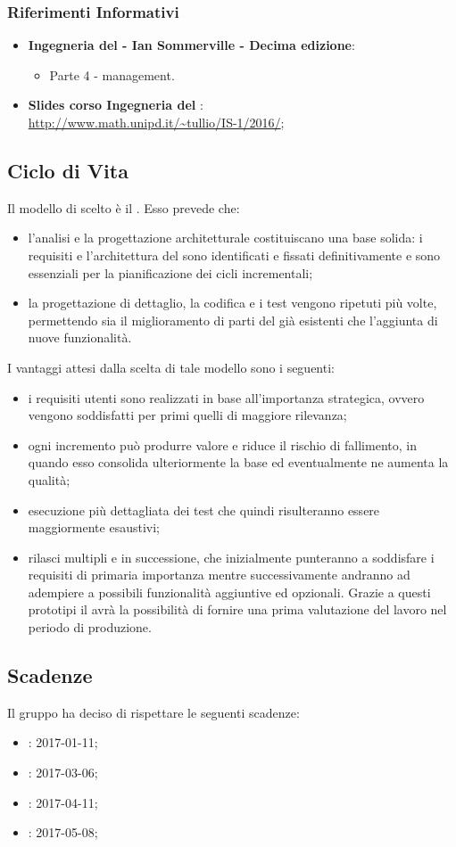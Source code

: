 	    \subsubsection{Riferimenti Informativi}
	    	\begin{itemize}
	    		\item \textbf{Ingegneria del  - Ian Sommerville - Decima edizione}:
	    		\begin{itemize}
	    			\item Parte 4 -  management.
	    		\end{itemize}
	    		\item \textbf{Slides corso Ingegneria del }: \\ \url{http://www.math.unipd.it/~tullio/IS-1/2016/};
	    	\end{itemize}
	    
	    \subsection{Ciclo di Vita}
	    Il modello di  scelto è il . Esso prevede che:
	    \begin{itemize}
	    	\item l'analisi e la progettazione architetturale costituiscano una base solida: i requisiti e l'architettura del  sono identificati e fissati definitivamente e sono essenziali per la pianificazione dei cicli incrementali;
	    	\item la progettazione di dettaglio, la codifica e i test vengono ripetuti più volte, permettendo sia il miglioramento di parti del  già esistenti che l'aggiunta di nuove funzionalità.
	    \end{itemize}
	    I vantaggi attesi dalla scelta di tale modello sono i seguenti:
	    \begin{itemize}
	    	\item i requisiti utenti sono realizzati in base all'importanza strategica, ovvero vengono soddisfatti per primi quelli di maggiore rilevanza;
	    	\item ogni incremento può produrre valore e riduce il rischio di fallimento, in quando esso consolida ulteriormente la base ed eventualmente ne aumenta la qualità;
	    	\item esecuzione più dettagliata dei test che quindi risulteranno essere maggiormente esaustivi;
	    	\item rilasci multipli e in successione, che inizialmente punteranno a soddisfare i requisiti di primaria importanza mentre successivamente andranno ad adempiere a possibili funzionalità aggiuntive ed opzionali. Grazie a questi prototipi il  avrà la possibilità di fornire una prima valutazione del lavoro nel periodo di produzione.
	    \end{itemize}
	    \subsection{Scadenze}
	    Il gruppo \AUTORE{} ha deciso di rispettare le seguenti scadenze:
	    \begin{itemize}
			\item \RR{}: 2017-01-11;
			\item \RP{}: 2017-03-06;
			\item \RQ{}: 2017-04-11;
			\item \RA{}: 2017-05-08;
	    \end{itemize}